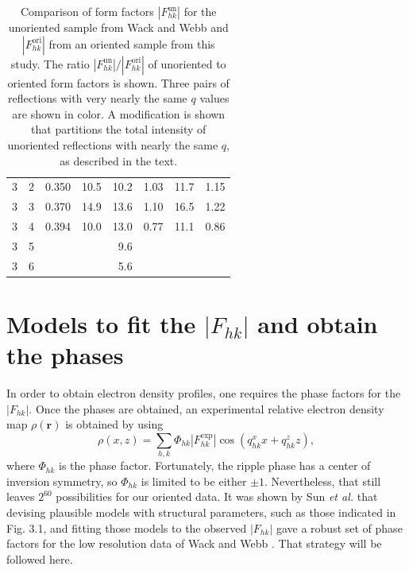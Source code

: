 \begin{table}[htbp]
\begin{tabular}{rrrrrrrr}
    3 &  2 & 0.350                & 10.5  & 10.2  & 1.03 & 11.7  & 1.15 \\
    3 &  3 & 0.370                & 14.9  & 13.6  & 1.10 & 16.5  & 1.22 \\
    3 &  4 & 0.394                & 10.0  & 13.0  & 0.77 & 11.1  & 0.86 \\
    3 &  5 &                      &       & 9.6   &                     \\
    3 &  6 &                      &       & 5.6   &                     \\
    \hline
  \end{tabular}
  \caption{Comparison of form factors $\left|F_{hk}^\text{un}\right|$ for the 
  unoriented sample from Wack and Webb \cite{ref:Wack89} and 
  $\left|F_{hk}^\text{ori}\right|$ from an oriented sample from this study. 
  The ratio $\left|F_{hk}^\text{un}\right|/\left|F_{hk}^\text{ori}\right|$ of 
  unoriented to oriented form factors is shown.  Three pairs of reflections 
  with very nearly the same $q$ values are shown in color.  A modification is 
  shown that partitions the total intensity of unoriented reflections with 
  nearly the same $q$, as described in the text.}
  \label{tab:cmu_vs_wack}
\end{table}

\newpage
\section{Models to fit the $|F_{hk}|$ and obtain the phases}\label{sec:LAXS_models}
In order to obtain electron density profiles, one requires the phase factors 
for the $|F_{hk}|$.  
Once the phases are obtained, an experimental relative electron density map 
$\rho(\mathbf{r})$ is obtained
by using
\begin{equation}
  \rho(x,z) = \sum_{h,k} \Phi_{hk} \left|F_{hk}^\text{exp}\right| \cos(q_{hk}^xx+q_{hk}^zz),
  \label{eq:Fourier_reconstruction}
\end{equation}
where $\Phi_{hk}$ is the phase factor.  
Fortunately, the ripple phase has a center of inversion symmetry, so 
$\Phi_{hk}$ is limited to be either $\pm 1$. Nevertheless, that still 
leaves $2^{60}$ possibilities for our oriented data.  
It was shown by Sun \textit{et al.} \cite{ref:Sun96} that devising plausible 
models with structural parameters, such as those indicated in Fig. 3.1, and 
fitting those models to the observed $|F_{hk}|$ gave a robust set of phase 
factors for the low resolution data of Wack and Webb \cite{ref:Wack89}.  
That strategy will be followed here.

